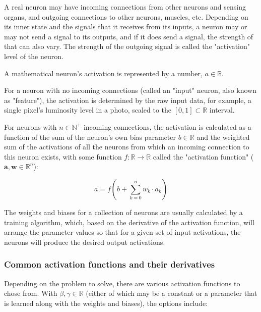 \documentclass[titlepage]{article}
\begin{document}
      A real neuron may have incoming connections from other neurons and
      sensing organs, and outgoing connections to other neurons, muscles, etc.
      Depending on its inner state and the signals that it receives from its
      inputs, a neuron may or may not send a signal to its outputs, and if it
      does send a signal, the strength of that can also vary. The strength of
      the outgoing signal is called the "activation" level of the neuron.

      A mathematical neuron's activation is represented by a number,
      $a \in \mathbb{R}$.

      For a neuron with no incoming connections (called an "input" neuron, also
      known as "feature"), the activation is determined by the raw input data,
      for example, a single pixel's luminosity level in a photo, scaled to the
      $[0, 1] \subset \mathbb{R}$ interval.

      For neurons with $n \in \mathbb{N}^+$ incoming connections, the
      activation is calculated as a function of the sum of the neuron's own
      bias parameter $b \in \mathbb{R}$ and the weighted sum of the activations
      of all the neurons from which an incoming connection to this neuron
      exists, with some function $f : \mathbb{R} \rightarrow \mathbb{R}$ called
      the "activation function" ($\mathbf{a}, \mathbf{w} \in \mathbb{R}^n$):

      \begin{equation}
        a = f \left( b + \sum_{k=0}^n w_k \cdot a_k \right)
      \end{equation}

      The weights and biases for a collection of neurons are usually calculated
      by a training algorithm, which, based on the derivative of the activation
      function, will arrange the parameter values so that for a given set of
      input activations, the neurons will produce the desired output
      activations.

      \subsubsection{%
        Common activation functions and their derivatives
      } \label{actfuncs}

        Depending on the problem to solve, there are various activation
        functions to chose from. With $\beta, \gamma \in \mathbb{R}$ (either of
        which may be a constant or a parameter that is learned along with the
        weights and biases), the options include:
\end{document}
